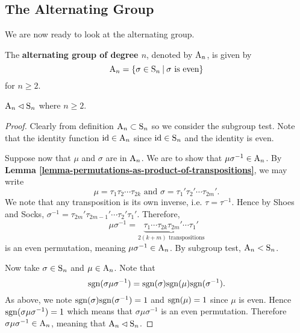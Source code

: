 \subsection{The Alternating Group}
We are now ready to look at the alternating group.
\begin{definition}
    The \textbf{alternating group of degree $n$}, denoted by $\mathrm{A}_{n}$, is given by
    \[
        \An{n} = \left\{\sigma \in \Sn{n} \vert \sigma \text{ is even}\right\}
    \]
    for $n \geq 2$.
\end{definition}

\begin{proposition}\label{prop-An-normal-subgroup-of-Sn}
    $\mathrm{A}_{n} \lhd \mathrm{S}_{n}$ where $n \geq 2$.
\end{proposition}
\begin{proof}
    Clearly from definition $\mathrm{A}_{n} \subset \mathrm{S}_{n}$ so we consider the subgroup test. Note that the identity function $\mathrm{id} \in \mathrm{A}_{n}$ since $\mathrm{id} \in \mathrm{S}_{n}$ and the identity is even.

    Suppose now that $\mu$ and $\sigma$ are in $\mathrm{A}_{n}$. We are to show that $\mu\sigma^{-1} \in \mathrm{A}_{n}$. By \textbf{Lemma \ref{lemma-permutations-as-product-of-transpositions}}, we may write
    \[
        \mu = \tau_1\tau_2\cdots\tau_{2k} \text{ and } \sigma = \tau_1'\tau_2'\cdots\tau_{2m}'.
    \]
    We note that any transposition is its own inverse, i.e. $\tau = \tau^{-1}$. Hence by Shoes and Socks, $\sigma^{-1} = \tau_{2m}'\tau_{2m-1}'\cdots\tau_2'\tau_1'$. Therefore,
    \[
        \mu\sigma^{-1} = \underbrace{\tau_1\cdots\tau_{2k}\tau_{2m}'\cdots\tau_1'}_{2(k+m) \text{ transpositions}}
    \]
    is an even permutation, meaning $\mu\sigma^{-1} \in \mathrm{A}_{n}$. By subgroup test, $\mathrm{A}_{n} < \mathrm{S}_{n}$.
    
    Now take $\sigma \in \mathrm{S}_{n}$ and $\mu \in \mathrm{A}_{n}$. Note that
    \[
        \mathrm{sgn}(\sigma\mu\sigma^{-1}) = \mathrm{sgn}(\sigma)\mathrm{sgn}(\mu)\mathrm{sgn}(\sigma^{-1}).
    \]
    As above, we note $\mathrm{sgn}(\sigma)\mathrm{sgn}(\sigma^{-1}) = 1$ and $\mathrm{sgn}(\mu) = 1$ since $\mu$ is even. Hence $\mathrm{sgn}(\sigma\mu\sigma^{-1}) = 1$ which means that $\sigma\mu\sigma^{-1}$ is an even permutation. Therefore $\sigma\mu\sigma^{-1} \in \mathrm{A}_{n}$, meaning that $\mathrm{A}_{n} \lhd \mathrm{S}_{n}$.
\end{proof}

